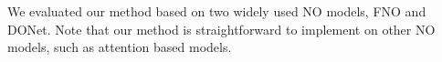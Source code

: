 We evaluated our method based on two widely used NO models, FNO and DONet. Note that our method is straightforward to implement on other NO models, such as attention based models.  

